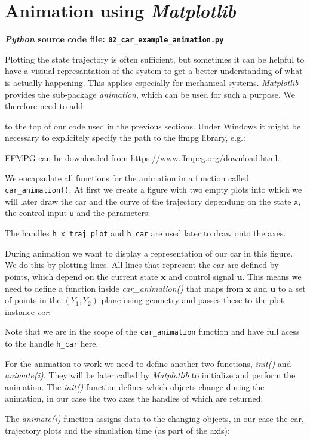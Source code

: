 \documentclass[a4paper,11pt,headings=standardclasses,parskip=half]{scrartcl}
\newcommand{\listcode}[3]{}
\newcommand{\listcodeanim}[2]{\listcode{#1}{#2}{../sim/02_car_example_animation.py}}
\newcommand{\py}{\emph{Python}\xspace}
\newcommand{\mpl}{\emph{Matplotlib}\xspace}
\newcommand{\uu}{\mathbf{u}}
\newcommand{\x}{\mathbf{x}}
\begin{document}
\section{Animation using \mpl} \label{sec:animation}

\textbf{\py source code file: \texttt{02\_car\_example\_animation.py}}

Plotting the state trajectory is often sufficient, but sometimes it can be helpful to have a visiual represantation of the system to get a better understanding of what is actually happening. This applies especially for mechanical systems. \mpl provides the sub-package \emph{animation}, which can be used for such a purpose. We therefore need to add 
\listcodeanim{6}{6}
to the top of our code used in the previous sections. Under Windows it might be necessary to explicitely specify the path to the ffmpg library, e.g.:
\listcodeanim{7}{7}
FFMPG can be downloaded from \url{https://www.ffmpeg.org/download.html}.

We encapsulate all functions for the animation in a function called \texttt{car\_animation()}. At first we create a figure with two empty plots into which we will later draw the car and the curve of the trajectory dependung on the state \texttt{x}, the control input \texttt{u} and the parameters:
\listcodeanim{137}{165}
The handles \texttt{h\_x\_traj\_plot} and \texttt{h\_car} are used later to draw onto the axes.

During animation we want to display a representation of our car in this figure. We do this by plotting lines. All lines that represent the car are defined by points, which depend on the current state $\x$ and control signal $\uu$. This means we need to define a function inside \emph{car\_animation()} that maps from $\x$ and $\uu$ to a set of points in the $(Y_1,Y_2)$-plane using geometry and passes these to the plot instance \emph{car}:
\listcodeanim{167}{226}
Note that we are in the scope of the \texttt{car\_animation} function and have full acess to the handle \texttt{h\_car} here.

For the animation to work we need to define another two functions, \emph{init()} and \emph{animate(i)}. They will be later called by \mpl to initialize and perform the animation. The \emph{init()}-function defines which objects change during the animation, in our case the two axes the handles of which are returned:
\listcodeanim{225}{234}

The \emph{animate(i)}-function assigns data to the changing objects, in our case the car, trajectory plots and the simulation time (as part of the axis):
\listcodeanim{236}{250}
\end{document}
